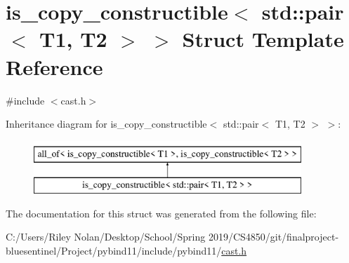 \hypertarget{structis__copy__constructible_3_01std_1_1pair_3_01_t1_00_01_t2_01_4_01_4}{}\section{is\+\_\+copy\+\_\+constructible$<$ std\+::pair$<$ T1, T2 $>$ $>$ Struct Template Reference}
\label{structis__copy__constructible_3_01std_1_1pair_3_01_t1_00_01_t2_01_4_01_4}


{\ttfamily \#include $<$cast.\+h$>$}

Inheritance diagram for is\+\_\+copy\+\_\+constructible$<$ std\+::pair$<$ T1, T2 $>$ $>$\+:\begin{figure}[H]
\begin{center}
\leavevmode
\includegraphics[height=2.000000cm]{structis__copy__constructible_3_01std_1_1pair_3_01_t1_00_01_t2_01_4_01_4}
\end{center}
\end{figure}


The documentation for this struct was generated from the following file\+:\begin{DoxyCompactItemize}
\item 
C\+:/\+Users/\+Riley Nolan/\+Desktop/\+School/\+Spring 2019/\+C\+S4850/git/finalproject-\/bluesentinel/\+Project/pybind11/include/pybind11/\mbox{\hyperlink{cast_8h}{cast.\+h}}\end{DoxyCompactItemize}
